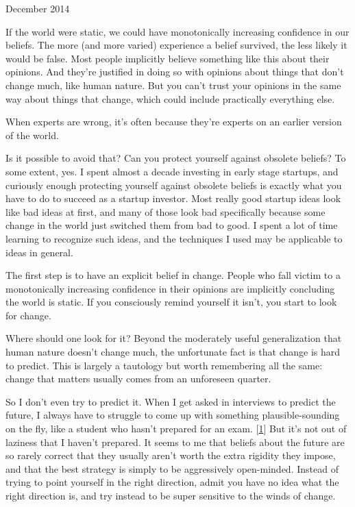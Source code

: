 December 2014

If the world were static, we could have monotonically increasing
confidence in our beliefs. The more (and more varied) experience a
belief survived, the less likely it would be false. Most people
implicitly believe something like this about their opinions. And they're
justified in doing so with opinions about things that don't change much,
like human nature. But you can't trust your opinions in the same way
about things that change, which could include practically everything
else.

When experts are wrong, it's often because they're experts on an earlier
version of the world.

Is it possible to avoid that? Can you protect yourself against obsolete
beliefs? To some extent, yes. I spent almost a decade investing in early
stage startups, and curiously enough protecting yourself against
obsolete beliefs is exactly what you have to do to succeed as a startup
investor. Most really good startup ideas look like bad ideas at first,
and many of those look bad specifically because some change in the world
just switched them from bad to good. I spent a lot of time learning to
recognize such ideas, and the techniques I used may be applicable to
ideas in general.

The first step is to have an explicit belief in change. People who fall
victim to a monotonically increasing confidence in their opinions are
implicitly concluding the world is static. If you consciously remind
yourself it isn't, you start to look for change.

Where should one look for it? Beyond the moderately useful
generalization that human nature doesn't change much, the unfortunate
fact is that change is hard to predict. This is largely a tautology but
worth remembering all the same: change that matters usually comes from
an unforeseen quarter.

So I don't even try to predict it. When I get asked in interviews to
predict the future, I always have to struggle to come up with something
plausible-sounding on the fly, like a student who hasn't prepared for an
exam. {[}\hyperref[f1n]{1}{]} But it's not out of laziness that I
haven't prepared. It seems to me that beliefs about the future are so
rarely correct that they usually aren't worth the extra rigidity they
impose, and that the best strategy is simply to be aggressively
open-minded. Instead of trying to point yourself in the right direction,
admit you have no idea what the right direction is, and try instead to
be super sensitive to the winds of change.

